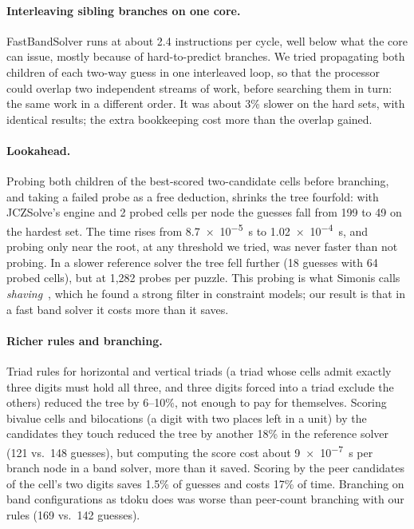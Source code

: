 \documentclass[11pt]{article}
\theoremstyle{definition}
\theoremstyle{plain}
\begin{document}
\paragraph{Interleaving sibling branches on one core.} FastBandSolver runs at about 2.4 instructions per cycle, well
below what the core can issue, mostly because of hard-to-predict branches. We tried propagating both children of each
two-way guess in one interleaved loop, so that the processor could overlap two independent streams of work, before
searching them in turn: the same work in a different order. It was about 3\% slower on the hard sets, with identical
results; the extra bookkeeping cost more than the overlap gained.

\paragraph{Lookahead.} Probing both children of the best-scored two-candidate cells before branching, and taking a
failed probe as a free deduction, shrinks the tree fourfold: with JCZSolve's engine and 2 probed cells per node the
guesses fall from 199 to 49 on the hardest set. The time rises from \SI{8.7e-5}{\second} to \SI{1.02e-4}{\second}, and probing only near the root, at
any threshold we tried, was never faster than not probing. In a slower reference solver the tree fell further (18
guesses with 64 probed cells), but at 1{,}282 probes per puzzle. This probing is what Simonis calls
\emph{shaving}~\cite{simonis2005sudoku}, which he found a strong filter in constraint models; our result is that in a
fast band solver it costs more than it saves.

\paragraph{Richer rules and branching.} Triad rules for horizontal and vertical triads (a triad whose cells admit exactly
three digits must hold all three, and three digits forced into a triad exclude the others) reduced the tree by
6--10\%, not enough to pay for themselves. Scoring bivalue cells and bilocations (a digit with two places left in a
unit) by the candidates they touch reduced the tree by another 18\% in the reference solver (121 vs.\ 148 guesses),
but computing the score cost about \SI{9e-7}{\second} per branch node in a band solver, more than it saved. Scoring by the peer
candidates of the cell's two digits saves 1.5\% of guesses and costs 17\% of time. Branching on band configurations
as tdoku does was worse than peer-count branching with our rules (169 vs.\ 142 guesses).
\end{document}
